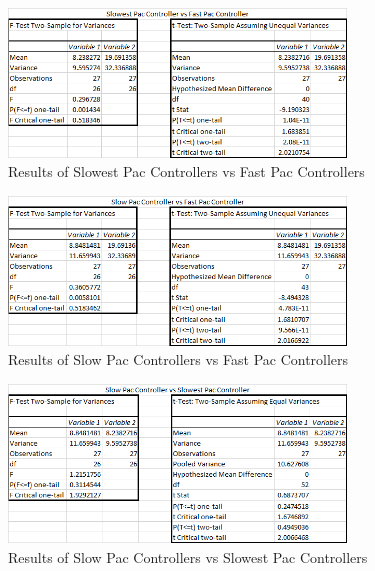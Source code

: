\documentclass{article}
\begin{document}
\begin{flushleft}
\begin{figure}[h]
	\centering
	\includegraphics[width=0.8\textwidth]{statsSlowestVsFast}
	\caption{Results of Slowest Pac Controllers vs Fast Pac Controllers}
\end{figure}

\clearpage

\begin{figure}[h]
	\centering
	\includegraphics[width=0.8\textwidth]{statsSlowVsFast}
	\caption{Results of Slow Pac Controllers vs Fast Pac Controllers}
\end{figure}
\end{flushleft}

\vspace{15mm}

\begin{flushleft}
\begin{figure}[h]
	\centering
	\includegraphics[width=0.8\textwidth]{statsSlowVsSlowest}
	\caption{Results of Slow Pac Controllers vs Slowest Pac Controllers}
\end{figure}
\end{flushleft}
\end{document}
